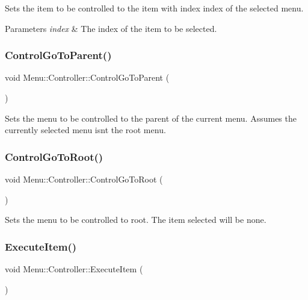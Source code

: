Sets the item to be controlled to the item with index index of the selected menu. 
\begin{DoxyParams}{Parameters}
{\em index} & The index of the item to be selected. \\
\hline
\end{DoxyParams}
\hypertarget{class_menu_1_1_controller_ad4bcb0925c933dce2cceacdbd1b26294}{}\label{class_menu_1_1_controller_ad4bcb0925c933dce2cceacdbd1b26294} 
\subsubsection{\texorpdfstring{Control\+Go\+To\+Parent()}{ControlGoToParent()}}
{\footnotesize\ttfamily void Menu\+::\+Controller\+::\+Control\+Go\+To\+Parent (\begin{DoxyParamCaption}{ }\end{DoxyParamCaption})}

Sets the menu to be controlled to the parent of the current menu. Assumes the currently selected menu isn\textquotesingle{}t the root menu. \hypertarget{class_menu_1_1_controller_a4d270009fff9dfc6baa4433f219626c4}{}\label{class_menu_1_1_controller_a4d270009fff9dfc6baa4433f219626c4} 
\subsubsection{\texorpdfstring{Control\+Go\+To\+Root()}{ControlGoToRoot()}}
{\footnotesize\ttfamily void Menu\+::\+Controller\+::\+Control\+Go\+To\+Root (\begin{DoxyParamCaption}{ }\end{DoxyParamCaption})}

Sets the menu to be controlled to root. The item selected will be none. \hypertarget{class_menu_1_1_controller_a0dda40652b8802a8fe39c1ce61a66f1a}{}\label{class_menu_1_1_controller_a0dda40652b8802a8fe39c1ce61a66f1a} 
\subsubsection{\texorpdfstring{Execute\+Item()}{ExecuteItem()}}
{\footnotesize\ttfamily void Menu\+::\+Controller\+::\+Execute\+Item (\begin{DoxyParamCaption}{ }\end{DoxyParamCaption})}

